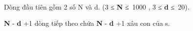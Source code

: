 Dòng đầu tiên gồm 2 số N và d. (3 ≤   \textbf{    N   }   ≤ 1000 , 3 ≤   \textbf{    d   }   ≤ 20).  

\textbf{    N   }   -   \textbf{    d   }   +1 dòng tiếp theo chứa   \textbf{    N   }   -   \textbf{    d   }   +1 xâu con của s.
